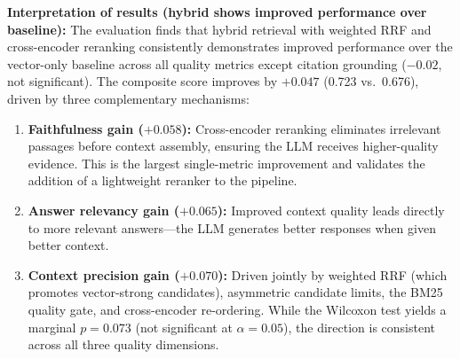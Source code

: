 \textbf{Interpretation of results (hybrid shows improved performance over baseline):} The evaluation finds that hybrid retrieval with weighted RRF and cross-encoder reranking consistently demonstrates improved performance over the vector-only baseline across all quality metrics except citation grounding ($-0.02$, not significant). The composite score improves by $+0.047$ (0.723 vs.\ 0.676), driven by three complementary mechanisms:

\begin{enumerate}[leftmargin=0.5in]
  \item \textbf{Faithfulness gain ($+0.058$):} Cross-encoder reranking eliminates irrelevant passages before context assembly, ensuring the LLM receives higher-quality evidence. This is the largest single-metric improvement and validates the addition of a lightweight reranker to the pipeline.
  \item \textbf{Answer relevancy gain ($+0.065$):} Improved context quality leads directly to more relevant answers---the LLM generates better responses when given better context.
  \item \textbf{Context precision gain ($+0.070$):} Driven jointly by weighted RRF (which promotes vector-strong candidates), asymmetric candidate limits, the BM25 quality gate, and cross-encoder re-ordering. While the Wilcoxon test yields a marginal $p = 0.073$ (not significant at $\alpha = 0.05$), the direction is consistent across all three quality dimensions.
\end{enumerate}

